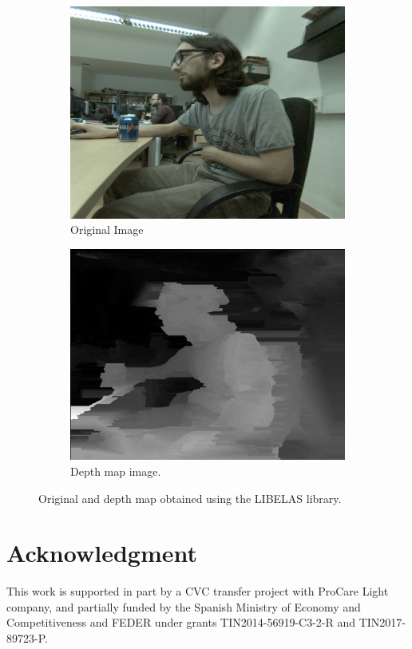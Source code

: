 \documentclass[10pt,a4paper,twocolumn,twoside]{article}
\begin{document}
	\begin{figure}
	\centering
	\begin{subfigure}[b]{0.7\linewidth}
		\includegraphics[width=\linewidth]{img/4}
		\caption{Original Image}
	\end{subfigure}
	\begin{subfigure}[b]{0.7\linewidth}
		\includegraphics[width=\linewidth]{img/4b}
		\caption{Depth map image.}
	\end{subfigure}
	\caption{Original and depth map obtained using the LIBELAS library.}
	\label{fig:depthmap}
\end{figure}
	

	\section{Acknowledgment}
	This work is supported in part by a CVC transfer project with ProCare Light company, and partially funded by the Spanish Ministry of Economy and Competitiveness and FEDER under grants TIN2014-56919-C3-2-R and TIN2017-89723-P.
	
\end{document}
